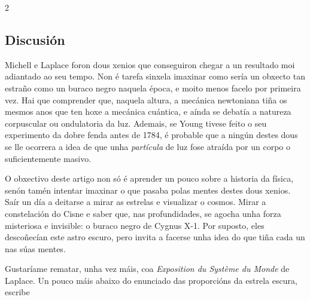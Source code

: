 \begin{multicols}{2}
\subsection*{Discusión}

Michell e Laplace foron dous xenios que conseguiron chegar a un resultado moi
adiantado ao seu tempo. Non é tarefa sinxela imaxinar como sería un obxecto tan
estraño como un buraco negro naquela época, e moito menos facelo por primeira
vez. Hai que comprender que, naquela altura, a mecánica newtoniana tiña os
mesmos anos que ten hoxe a mecánica cuántica, e aínda se debatía a natureza
corpuscular ou ondulatoria da luz. Ademais, se Young tivese feito o seu
experimento da dobre fenda antes de 1784, é probable que a ningún destes dous
se lle ocorrera a idea de que unha \textit{partícula} de luz fose atraída por
un corpo o suficientemente masivo.

O obxectivo deste artigo non só é aprender un pouco sobre a historia da física,
senón tamén intentar imaxinar o que pasaba polas mentes destes dous xenios.
Saír un día a deitarse a mirar as estrelas e visualizar o cosmos. Mirar a
constelación do Cisne e saber que, nas profundidades, se agocha unha forza
misteriosa e invisible: o buraco negro de Cygnus X-1. Por suposto, eles
descoñecían este astro escuro, pero invita a facerse unha idea do que tiña cada
un nas súas mentes.

Gustaríame rematar, unha vez máis, coa \textit{Exposition du Système du Monde}
de Laplace. Un pouco máis abaixo do enunciado das proporcións da estrela
escura, escribe%


\nocite{luz_bradley}
\nocite{laplace_original}
\nocite{star_wars_iv}
\nocite{cygnus_x1}

\printbibliography

\end{multicols}
